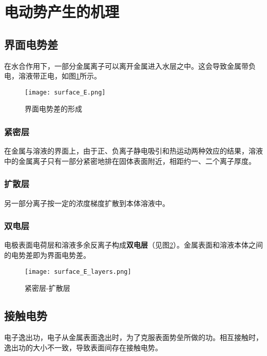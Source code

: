 \section{电动势产生的机理}

    \subsection{界面电势差}

    在水合作用下，一部分金属离子可以离开金属进入水层之中。这会导致金属带负电，溶液带正电，如图\ref{fig:surface_E}所示。

    \begin{figure}[h]
        \centering
        \texttt{[image: surface\_E.png]}
        \caption{界面电势差的形成}
        \label{fig:surface_E}
    \end{figure}
    
    \subsubsection{紧密层}
    在金属与溶液的界面上，由于正、负离子静电吸引和热运动两种效应的结果，溶液中的金属离子只有一部分紧密地排在固体表面附近，相距约一、二个离子厚度。
    \subsubsection{扩散层}
    另一部分离子按一定的浓度梯度扩散到本体溶液中。

    \subsubsection{双电层}

    电极表面电荷层和溶液多余反离子构成\textbf{双电层}（见图\ref{fig:surface_E_layers}）。金属表面和溶液本体之间的电势差即为界面电势差。

    
    \begin{figure}[h]
        \centering
        \texttt{[image: surface\_E\_layers.png]}
        \caption{紧密层-扩散层}
        \label{fig:surface_E_layers}
    \end{figure}


    

    \subsection{接触电势}

    电子逸出功，电子从金属表面逸出时，为了克服表面势垒所做的功。相互接触时，逸出功的大小不一致，导致表面间存在接触电势。


